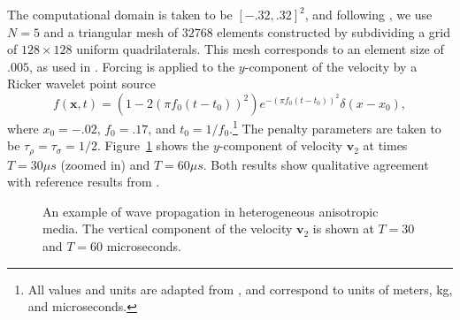 \documentclass{siamart0216}
\newcommand{\LRp}[1]{\left( #1 \right)}
\begin{document}
The computational domain is taken to be $[-.32, .32]^2$, and following \cite{komatitsch2000simulation,de2007arbitrary}, we use $N=5$ and a triangular mesh of $32768$ elements constructed by subdividing a grid of $128\times 128$ uniform quadrilaterals.  This mesh corresponds to an element size of $.005$, as used in \cite{komatitsch2000simulation,de2007arbitrary}.  Forcing is applied to the $y$-component of the velocity by a Ricker wavelet point source 
\[
f(\bm{x},t) = \LRp{1 - 2(\pi f_0 (t-t_0))^2} e^{-(\pi f_0 (t-t_0))^2}\delta(x-x_0),
\]
where $x_0 = -.02$, $f_0 = .17$, and $t_0 = 1/f_0$.\footnote{All values and units are adapted from \cite{komatitsch2000simulation,de2007arbitrary}, and correspond to units of meters, kg, and microseconds.}  The penalty parameters are taken to be $\tau_\rho = \tau_\sigma = 1/2$.  Figure~\ref{fig:aniso} shows the $y$-component of velocity $\bm{v}_2$ at times $T = 30 \mu s$ (zoomed in) and $T= 60 \mu s$.  Both results show qualitative agreement with reference results from \cite{carcione1988wave,komatitsch2000simulation,de2007arbitrary}.  
\begin{figure}
\centering
\hspace{3em}
\caption{An example of wave propagation in heterogeneous anisotropic media.  The vertical component of the velocity $\bm{v}_2$ is shown at $T = 30$ and $T=60$ microseconds. }
\label{fig:aniso}
\end{figure}
\end{document}
